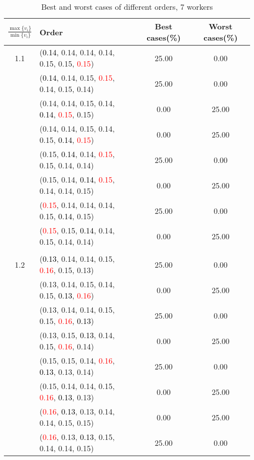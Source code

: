 \documentclass[10pt,a4paper]{report}
\begin{document}
\newpage\begin{center}
	\small
	\begin{longtable}{clcc}
		\caption{Best and worst cases of different orders, 7 workers}\\
		\toprule
		\setlength{\tabcolsep}{1mm}
		\renewcommand\baselinestretch{0.5}\selectfont
		$\frac{\max\{v_i\}}{\min\{v_i\}}$ & Order & Best cases(\%) & Worst cases(\%) \\
			\midrule		1.1			&(\textcolor{black}{0.14}, 0.14, 0.14, 0.14, 0.15, 0.15, \textcolor{red}{0.15})&25.00&0.00\\
			&(\textcolor{black}{0.14}, 0.14, 0.15, \textcolor{red}{0.15}, 0.14, 0.15, 0.14)&25.00&0.00\\
			&(0.14, 0.14, 0.15, 0.14, \textcolor{black}{0.14}, \textcolor{red}{0.15}, 0.15)&0.00&25.00\\
			&(0.14, 0.14, 0.15, 0.14, 0.15, \textcolor{black}{0.14}, \textcolor{red}{0.15})&0.00&25.00\\
			&(0.15, \textcolor{black}{0.14}, 0.14, \textcolor{red}{0.15}, 0.15, 0.14, 0.14)&25.00&0.00\\
			&(0.15, 0.14, \textcolor{black}{0.14}, \textcolor{red}{0.15}, 0.14, 0.14, 0.15)&0.00&25.00\\
			&(\textcolor{red}{0.15}, 0.14, 0.14, 0.14, 0.15, \textcolor{black}{0.14}, 0.15)&25.00&0.00\\
			&(\textcolor{red}{0.15}, 0.15, \textcolor{black}{0.14}, 0.14, 0.15, 0.14, 0.14)&0.00&25.00\\
		&&&\\
		1.2			&(\textcolor{black}{0.13}, 0.14, 0.14, 0.15, \textcolor{red}{0.16}, 0.15, 0.13)&25.00&0.00\\
			&(0.13, 0.14, 0.15, 0.14, 0.15, \textcolor{black}{0.13}, \textcolor{red}{0.16})&0.00&25.00\\
			&(0.13, 0.14, 0.14, 0.15, 0.15, \textcolor{red}{0.16}, \textcolor{black}{0.13})&25.00&0.00\\
			&(0.13, 0.15, \textcolor{black}{0.13}, 0.14, 0.15, \textcolor{red}{0.16}, 0.14)&0.00&25.00\\
			&(0.15, 0.15, 0.14, \textcolor{red}{0.16}, \textcolor{black}{0.13}, 0.13, 0.14)&25.00&0.00\\
			&(0.15, 0.14, 0.14, 0.15, \textcolor{red}{0.16}, \textcolor{black}{0.13}, 0.13)&0.00&25.00\\
			&(\textcolor{red}{0.16}, \textcolor{black}{0.13}, 0.13, 0.14, 0.14, 0.15, 0.15)&0.00&25.00\\
			&(\textcolor{red}{0.16}, 0.13, \textcolor{black}{0.13}, 0.15, 0.14, 0.14, 0.15)&25.00&0.00\\

\end{longtable}
\end{center}
\end{document}
